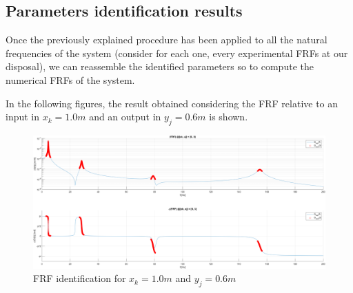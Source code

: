 \subsection{Parameters identification results}
\label{subsec:parameters_identification_results}

Once the previously explained procedure has been applied to all the natural frequencies of the system (consider for each one, every experimental FRFs at our disposal), we can reassemble the identified parameters so to compute the numerical FRFs of the system.

In the following figures, the result obtained considering the FRF relative to an input in $x_k = 1.0m$ and an output in $y_j = 0.6m$ is shown.

\begin{figure}[H]
    \centering
    \includegraphics[width=\textwidth]{img/MATLAB/Part_A/Comparison_FRF_couple_3_5.png}
    \caption{FRF identification for $x_k = 1.0m$ and $y_j = 0.6m$}
    \label{fig:FRF_identification}
\end{figure}

